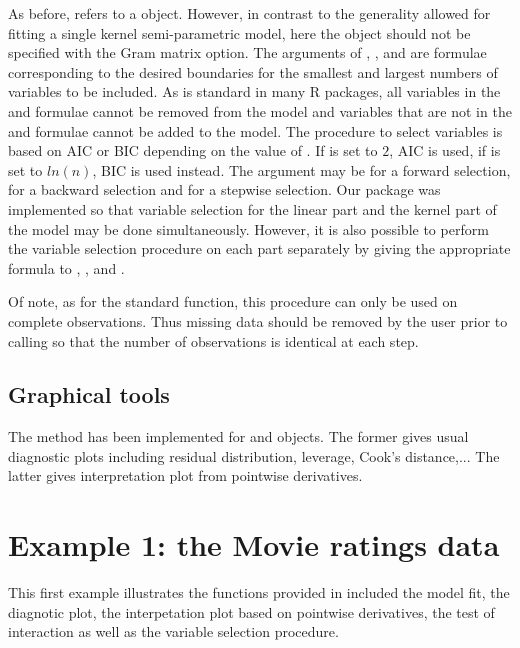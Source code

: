 As before,  refers to a  object. However, in contrast to the generality allowed for fitting a single kernel semi-parametric model, here the  object should not be specified with the Gram matrix option. The arguments of , ,  and  are formulae corresponding to the desired boundaries for the smallest and largest numbers of variables to be included. As is standard in many R packages, all variables in the  and  formulae cannot be removed from the model and variables that are not in the  and  formulae cannot be added to the model. The procedure to select variables is based on AIC or BIC depending on the value of . If  is set to $2$, AIC is used, if  is set to $ln(n)$, BIC is used instead. The  argument may be  for a forward selection,  for a backward selection and  for a stepwise selection. Our package was implemented so that variable selection for the linear part and the kernel part of the model may be done simultaneously. However, it is also possible to perform the variable selection procedure on each part separately by giving the appropriate formula to , ,  and .

Of note, as for the standard  function, this procedure can only be used on complete observations.  Thus missing data should be removed by the user prior to calling  so that the number of observations is identical at each step.


\subsection{Graphical tools}

The  method has been implemented for  and  objects. The former gives usual diagnostic plots including residual distribution, leverage, Cook's distance,... The latter gives interpretation plot from pointwise derivatives. 

\section{Example 1: the Movie ratings data} 


This first example illustrates the functions provided in  included the model fit, the diagnotic plot, the interpetation plot based on pointwise derivatives, the test of interaction as well as the variable selection procedure.

